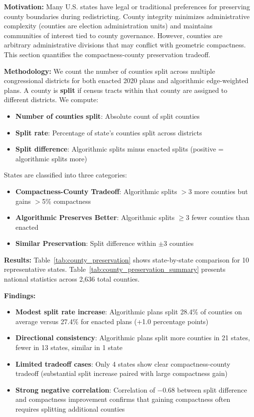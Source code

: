 \textbf{Motivation:} Many U.S. states have legal or traditional preferences for preserving county boundaries during redistricting. County integrity minimizes administrative complexity (counties are election administration units) and maintains communities of interest tied to county governance. However, counties are arbitrary administrative divisions that may conflict with geometric compactness. This section quantifies the compactness-county preservation tradeoff.

\textbf{Methodology:} We count the number of counties split across multiple congressional districts for both enacted 2020 plans and algorithmic edge-weighted plans. A county is \textbf{split} if census tracts within that county are assigned to different districts. We compute:
\begin{itemize}
    \item \textbf{Number of counties split}: Absolute count of split counties
    \item \textbf{Split rate}: Percentage of state's counties split across districts
    \item \textbf{Split difference}: Algorithmic splits minus enacted splits (positive = algorithmic splits more)
\end{itemize}

States are classified into three categories:
\begin{itemize}
    \item \textbf{Compactness-County Tradeoff}: Algorithmic splits $>$3 more counties but gains $>$5\% compactness
    \item \textbf{Algorithmic Preserves Better}: Algorithmic splits $\geq$3 fewer counties than enacted
    \item \textbf{Similar Preservation}: Split difference within $\pm$3 counties
\end{itemize}

\textbf{Results:} Table~\ref{tab:county_preservation} shows state-by-state comparison for 10 representative states. Table~\ref{tab:county_preservation_summary} presents national statistics across 2,636 total counties.




\textbf{Findings:}
\begin{itemize}
    \item \textbf{Modest split rate increase}: Algorithmic plans split 28.4\% of counties on average versus 27.4\% for enacted plans (+1.0 percentage points)
    \item \textbf{Directional consistency}: Algorithmic plans split more counties in 21 states, fewer in 13 states, similar in 1 state
    \item \textbf{Limited tradeoff cases}: Only 4 states show clear compactness-county tradeoff (substantial split increase paired with large compactness gain)
    \item \textbf{Strong negative correlation}: Correlation of $-0.68$ between split difference and compactness improvement confirms that gaining compactness often requires splitting additional counties
\end{itemize}

